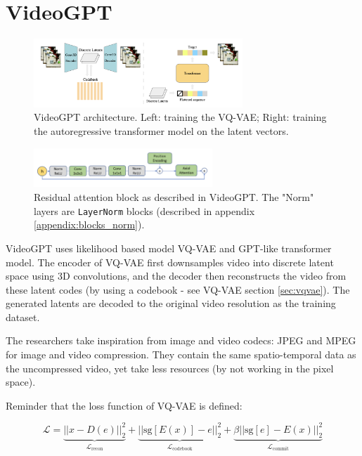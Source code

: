 \section{VideoGPT}

\begin{figure}
    \centering
    \includegraphics[width=0.7\textwidth]{images/video_synthesis/videogpt_architecture.png}
    \caption{VideoGPT architecture. Left: training the VQ-VAE; Right: training the autoregressive transformer model on the latent vectors.}
\end{figure}

\begin{figure}
    \centering
    \includegraphics[width=0.6\textwidth]{images/video_synthesis/videogpt_res_atten_block.png}
    \caption{Residual attention block as described in VideoGPT. The "Norm" layers are \texttt{LayerNorm} blocks (described in appendix \ref{appendix:blocks_norm}).}
    \label{fig:videogpt_res_atten_block}
\end{figure}

VideoGPT \cite{videogpt} uses likelihood based model VQ-VAE and GPT-like transformer model. The encoder of VQ-VAE first downsamples video into discrete latent space using 3D convolutions, and the decoder then reconstructs the video from these latent codes (by using a codebook - see VQ-VAE section \ref{sec:vqvae}). The generated latents are decoded to the original video resolution as the training dataset.

The researchers take inspiration from image and video codecs: JPEG and MPEG for image and video compression. They contain the same spatio-temporal data as the uncompressed video, yet take less resources (by not working in the pixel space).

Reminder that the loss function of VQ-VAE is defined:

\begin{equation*}
    \mathcal{L} = \underbrace{\left| \left| x - D(e) \right| \right|^2_2}_{\mathcal{L}_\text{recon}} + \underbrace{\left| \left| \text{sg}\left[ E(x) \right] - e \right| \right|^2_2}_{\mathcal{L}_\text{codebook}} + \underbrace{\beta \left| \left| \text{sg}[e] - E(x) \right| \right|^2_2}_{\mathcal{L}_\text{commit}}
\end{equation*}

